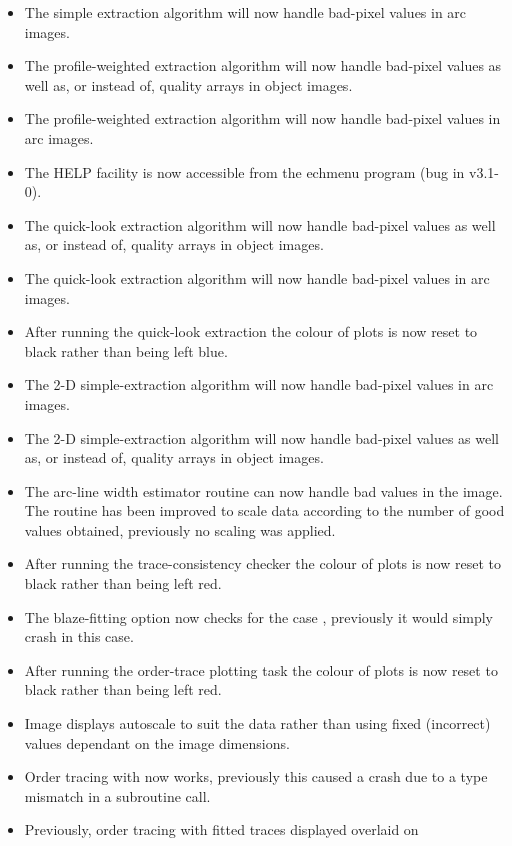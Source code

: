 \begin{itemize}
\item The simple extraction algorithm will now handle bad-pixel values in
   arc images.
\item The profile-weighted extraction algorithm will now handle bad-pixel
   values as well as, or instead of, quality arrays in object images.
\item The profile-weighted extraction algorithm will now handle bad-pixel
   values in arc images.
\item The HELP facility is now accessible from the echmenu program (bug in
   v3.1-0).
\item The quick-look extraction algorithm will now handle bad-pixel
   values as well as, or instead of, quality arrays in object images.
\item The quick-look extraction algorithm will now handle bad-pixel
   values in arc images.
\item After running the quick-look extraction the colour of plots is now
   reset to black rather than being left blue.
\item The 2-D simple-extraction algorithm will now handle bad-pixel values
   in arc images.
\item The 2-D simple-extraction algorithm will now handle bad-pixel values
   as well as, or instead of, quality arrays in object images.
\item The arc-line width estimator routine can now handle bad values in the
   image.  The routine has been improved to scale data according to the
   number of good values obtained, previously no scaling was applied.
\item After running the trace-consistency checker the colour of plots is
   now reset to black rather than being left red.
\item The blaze-fitting option now checks for the case
   ,
   previously it would simply crash in this case.
\item After running the order-trace plotting task the colour of plots is
   now reset to black rather than being left red.
\item Image displays autoscale to suit the data rather than using fixed
   (incorrect) values dependant on the image dimensions.
\item Order tracing with  now works,
   previously this caused
   a crash due to a type mismatch in a subroutine call.
\item Previously, order tracing with fitted traces displayed overlaid on

\end{itemize}
